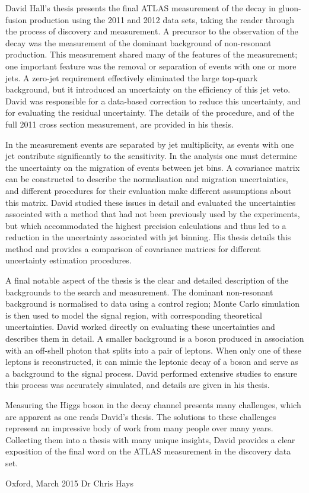 David Hall's thesis presents the final ATLAS measurement of the \HWW decay in gluon-fusion 
production using the 2011 and 2012 data sets, taking the reader through the process of 
discovery and measurement. A precursor to the observation of the \HWW decay was the 
measurement of the dominant background of non-resonant \WW production. This measurement 
shared many of the features of the \HWW measurement; one important feature was the removal or 
separation of events with one or more jets. A zero-jet requirement effectively eliminated the 
large top-quark background, but it introduced an uncertainty on the efficiency of this jet 
veto. David was responsible for a data-based correction to reduce this uncertainty, and for 
evaluating the residual uncertainty. The details of the procedure, and of the full 2011 \WW 
cross section measurement, are provided in his thesis.

In the \HWW measurement events are separated by jet multiplicity, as events with one jet 
contribute significantly to the sensitivity. In the analysis one must determine the 
uncertainty on the migration of events between jet bins. A covariance matrix can be 
constructed to describe the normalisation and migration uncertainties, and different 
procedures for their evaluation make different assumptions about this matrix. David studied 
these issues in detail and evaluated the uncertainties associated with a method that had not 
been previously used by the experiments, but which accommodated the highest precision 
calculations and thus led to a reduction in the uncertainty associated with jet binning. His 
thesis details this method and provides a comparison of covariance matrices for different 
uncertainty estimation procedures.

A final notable aspect of the thesis is the clear and detailed description of the backgrounds 
to the \HWW search and measurement. The dominant non-resonant \WW background is normalised to 
data using a control region; Monte Carlo simulation is then used to model the signal region, 
with corresponding theoretical uncertainties. David worked directly on evaluating these 
uncertainties and describes them in detail. A smaller background is a \PW boson produced in 
association with an off-shell photon that splits into a pair of leptons. When only one of 
these leptons is reconstructed, it can mimic the leptonic decay of a \PW boson and serve as a 
background to the signal process. David performed extensive studies to ensure this process 
was accurately simulated, and details are given in his thesis.

Measuring the Higgs boson in the \WW decay channel presents many challenges, which are 
apparent as one reads David's thesis. The solutions to these challenges represent an 
impressive body of work from many people over many years. Collecting them into a thesis with 
many unique insights, David provides a clear exposition of the final word on the ATLAS \HWW 
measurement in the discovery data set.

\vspace{12pt}\noindent
Oxford, March 2015 \hfill Dr Chris Hays
